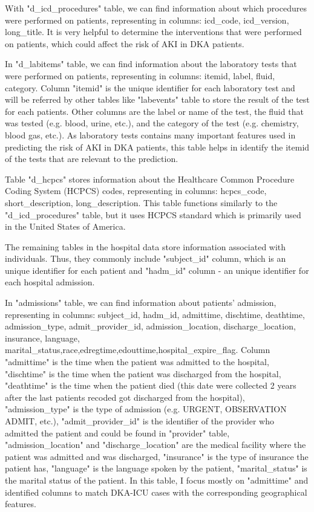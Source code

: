 \documentclass[../main.tex]{subfiles}
\begin{document}
With "d\_icd\_procedures" table, we can find information about which procedures were performed on patients, representing in columns: icd\_code, icd\_version, long\_title.
It is very helpful to determine the interventions that were performed on patients, which could affect the risk of AKI in DKA patients.

In "d\_labitems" table, we can find information about the laboratory tests that were performed on patients, representing in columns: itemid, label, fluid, category. Column "itemid" is the unique identifier for each laboratory test and will be referred by other tables like "labevents" table to store the result of the test for each patients. Other columns are the label or name of the test, the fluid that was tested (e.g. blood, urine, etc.), and the category of the test (e.g. chemistry, blood gas, etc.).
As laboratory tests contains many important features used in predicting the risk of AKI in DKA patients, this table helps in identify the itemid of the tests that are relevant to the prediction.

Table "d\_hcpcs" stores information about the Healthcare Common Procedure Coding System (HCPCS) codes, representing in columns: hcpcs\_code, short\_description, long\_description.
This table functions similarly to the "d\_icd\_procedures" table, but it uses HCPCS standard which is primarily used in the United States of America.

The remaining tables in the hospital data store information associated with individuals.
Thus, they commonly include "subject\_id" column, which is an unique identifier for each patient and "hadm\_id" column - an unique identifier for each hospital admission.

In "admissions" table, we can find information about patients' admission, representing in columns: subject\_id, hadm\_id, admittime, dischtime, deathtime, admission\_type, admit\_provider\_id, admission\_location, discharge\_location, insurance, language, marital\_status,race,edregtime,edouttime,hospital\_expire\_flag.
Column "admittime" is the time when the patient was admitted to the hospital,
"dischtime" is the time when the patient was discharged from the hospital,
"deathtime" is the time when the patient died (this date were collected 2 years after the last patients recoded got discharged from the hospital),
"admission\_type" is the type of admission (e.g. URGENT, OBSERVATION ADMIT, etc.),
"admit\_provider\_id" is the identifier of the provider who admitted the patient and could be found in "provider" table,
"admission\_location" and "discharge\_location" are the medical facility where the patient was admitted and was discharged,
"insurance" is the type of insurance the patient has,
"language" is the language spoken by the patient,
"marital\_status" is the marital status of the patient.
In this table, I focus mostly on "admittime" and identified columns to match DKA-ICU cases with the corresponding geographical features.
\end{document}
